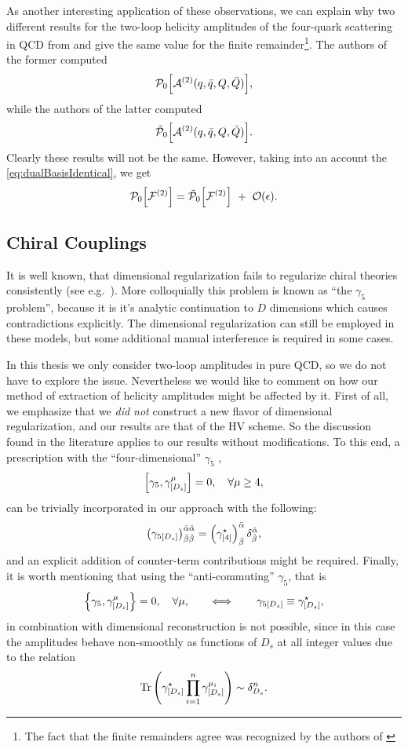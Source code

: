As another interesting application of these observations, we can explain why 
two different results for the two-loop helicity amplitudes of the four-quark scattering in QCD
from \cite{Glover:2004si} and \cite{DeFreitas:2004kmi} give the same
value for the finite remainder\footnote{The fact that the finite remainders agree was recognized by the authors of \cite{DeFreitas:2004kmi}}.
The authors of the former computed 
\[
  \mathcal{P}_0\qty[\mathcal{A}^{(2)}(q,\bar{q},Q,\bar{Q})],
\]
while the authors of the latter computed
\[
  \tilde{\mathcal{P}}_0\qty[\mathcal{A}^{(2)}(q,\bar{q},Q,\bar{Q})].
\]
Clearly these results will not be the same. 
However, taking into an account the \cref{eq:dualBasisIdentical}, we get
\[
  \mathcal{P}_0\qty[\mathcal{F}^{(2)}] = \tilde{\mathcal{P}}_0\qty[\mathcal{F}^{(2)}] ~+~ \order{\epsilon}.
\]

\subsection{Chiral Couplings}

It is well known, that dimensional regularization fails to regularize chiral theories consistently
(see e.g.\ \cite{Larin:1993tq,Boughezal:2019xpp,Jegerlehner:2000dz,Bonneau:1980yb,Bruque:2018bmy,Baikov:1991qz,Kreimer:1989ke}).
More colloquially this problem is known as ``the $\gamma_5$ problem'', because it is it's analytic
continuation to $D$ dimensions which causes contradictions explicitly.
The dimensional regularization can still be employed in these models, 
but some additional manual interference is required in some cases. 

In this thesis we only consider two-loop amplitudes in pure QCD, so we do not have to explore the issue. 
Nevertheless we would like to comment on how our method of extraction of helicity amplitudes might be affected by it.
First of all, we emphasize that we \emph{did not} construct a new flavor of dimensional regularization,
and our results are that of the HV scheme.  So the discussion found in the literature applies to our results without modifications.
To this end, a prescription with  the ``four-dimensional'' $\gamma_5$ \cite{tHooft:1972tcz,Breitenlohner:1977hr,Larin:1993tq},
\[\commutator{\gamma_{5}}{\gamma^{\mu}_{[D_s]}}=0, \quad \forall \mu\geq 4,\]
can be trivially incorporated in our approach with the following:
\[
  \qty(\gamma_{5[D_s]})^{\bar{\alpha}\hat{\alpha}}_{\bar{\beta}\hat{\beta}} = \qty(\gamma^\star_{[4]})^{\bar{\alpha}}_{\bar{\beta}}\,\delta^{\hat{\alpha}}_{\hat{\beta}},
\]
and an explicit addition of counter-term contributions might be required.
Finally, it is worth mentioning that using the ``anti-commuting'' $\gamma_5$, that is
\[
  \anticommutator{\gamma_{5}}{\gamma^{\mu}_{[D_s]}}=0, \quad \forall \mu, \qquad\Longleftrightarrow\qquad \gamma_{5[D_s]} \equiv \gamma^\star_{[D_s]},
\]
in combination with dimensional reconstruction is not possible, since
in this case the amplitudes behave non-smoothly as functions of $D_s$ at all integer values due to the relation
\begin{equation}
  \Tr\qty(\gamma^\star_{[D_s]} \prod_{i=1}^{n} \gamma^{\mu_i}_{[D_s]}) \sim \delta^n_{D_s}.
\end{equation}


